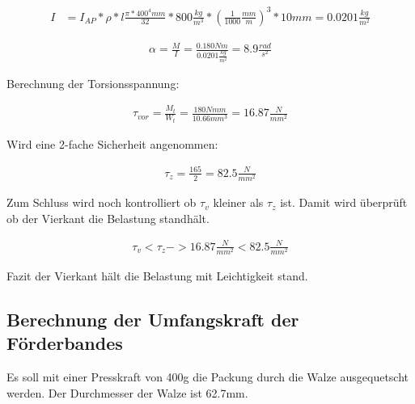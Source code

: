 \begin{align*}
I & = I_{ AP }*\rho*l\frac{ \pi*400^{4}mm }{32}*800\frac{ kg }{ m^{3} }*(\frac{ 1 }{ 1000}\frac{ mm }{ m })^{3}*10mm  = 0.0201\frac{kg}{m^{2}}
\end{align*}

\begin{align*}
\alpha = \frac{ M }{ I }=\frac{ 0.180Nm }{ 0.0201\frac{kg}{m^{2}} } = 8.9 \frac{ rad }{ s^{2} }
\end{align*}

Berechnung der Torsionsspannung:

\begin{align*}
\tau_{ vor } = \frac{ M_{ t } }{W_{ t } } = \frac{ 180 Nmm }{ 10.66 mm^{3} } = 16.87\frac{ N }{mm^{2}}
\end{align*}

Wird eine 2-fache Sicherheit angenommen:

\begin{align*}
\tau_z=\frac{165}{2}=82.5\frac{N}{mm^{2}}
\end{align*}

Zum Schluss wird noch kontrolliert ob $\tau_v$ kleiner als $\tau_z$ ist.
Damit wird überprüft ob der Vierkant die Belastung standhält.

\begin{align*}
\tau_v < \tau_z  ->  16.87 \frac{N}{mm^{2}} < 82.5\frac{N}{mm^{2}}
\end{align*}

Fazit der Vierkant hält die Belastung mit Leichtigkeit stand.

\subsection{Berechnung der Umfangskraft der Förderbandes}

Es soll mit einer Presskraft von 400g die Packung durch die Walze ausgequetscht werden. Der Durchmesser der Walze ist 62.7mm.


